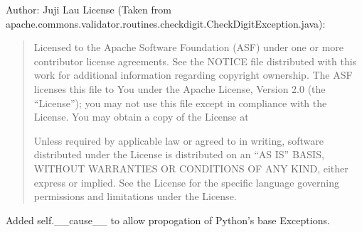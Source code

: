 \documentclass[letterpaper,10pt,english]{sphinxmanual}
\begin{document}
\sphinxAtStartPar
Author: Juji Lau
License (Taken from apache.commons.validator.routines.checkdigit.CheckDigitException.java):
\begin{quote}

\sphinxAtStartPar
Licensed to the Apache Software Foundation (ASF) under one or more
contributor license agreements. See the NOTICE file distributed with
this work for additional information regarding copyright ownership.
The ASF licenses this file to You under the Apache License, Version 2.0
(the “License”); you may not use this file except in compliance with
the License. You may obtain a copy of the License at
\begin{quote}

\sphinxAtStartPar
{}
\end{quote}

\sphinxAtStartPar
Unless required by applicable law or agreed to in writing, software
distributed under the License is distributed on an “AS IS” BASIS,
WITHOUT WARRANTIES OR CONDITIONS OF ANY KIND, either express or implied.
See the License for the specific language governing permissions and
limitations under the License.
\end{quote}
\begin{description}
\sphinxAtStartPar
Added self.\_\_cause\_\_ to allow propogation of Python’s base Exceptions.

\end{description}
\end{document}
